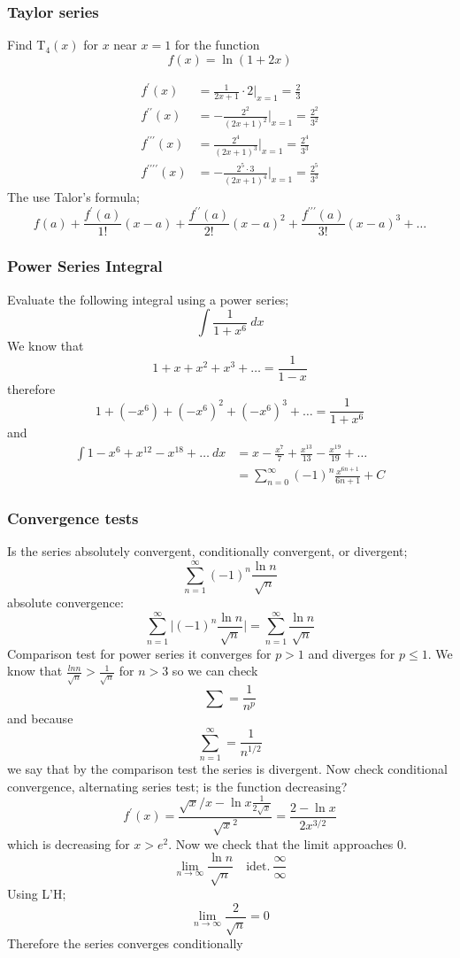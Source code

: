 \documentclass{article}
\begin{document}
\begin{multicols}{2}
\subsubsection*{Taylor series}
Find T$_4(x)$ for $x$ near $x=1$ for the function
\[
	f(x) = \ln (1+2x)
\]

\begin{align*}
	f^\prime(x) &= \frac{1}{2x+1} \cdot 2 \biggr\vert_{x=1} = \frac{2}{3} \\
	f^{\prime \prime}(x) &= -\frac{2^2}{(2x+1)^2} \biggr\vert_{x=1} = \frac{2^2}{3^2} \\
	f^{\prime \prime \prime}(x) &= \frac{2^4}{(2x+1)^3} \biggr\vert_{x=1} = \frac{2^4}{3^3}\\
	f^{\prime \prime \prime \prime}(x) &= -\frac{2^5 \cdot 3}{(2x+1)^4} \biggr\vert_{x=1} = \frac{2^5}{3^3}
\end{align*}
The use Talor's formula;
\[
	f(a) + \frac{f^\prime(a)}{1!}(x-a) + \frac{f^{\prime \prime}(a)}{2!}(x-a)^2 + \frac{f^{\prime \prime \prime}(a)}{3!}(x-a)^3 + \dots
\]

\subsubsection*{Power Series Integral}
Evaluate the following integral using a power series;
\[
	\int \frac{1}{1+x^6}\ dx
\]
We know that
\[
	1 + x + x^2 + x^3 + \dots = \frac{1}{1-x}
\]
therefore
\[
	1 + (-x^6) + (-x^6)^2 + (-x^6)^3 + \dots = \frac{1}{1+x^6}
\]
and
\begin{align*}
	\int 1-x^6+x^{12}-x^{18} + \dots \ dx &= x - \frac{x^7}{7}+\frac{x^13}{13}-\frac{x^19}{19} + \dots \\
	&= \sum_{n=0}^\infty (-1)^n \frac{ x^{6n+1}}{6n+1} + C
\end{align*}

\subsubsection*{Convergence tests}
Is the series absolutely convergent, conditionally convergent, or divergent;
\[
	\sum_{n=1}^\infty (-1)^n \frac{\ln n}{\sqrt{n}}
\]
absolute convergence:
\[
	\sum_{n=1}^\infty \Biggr\vert (-1)^n \frac{\ln n}{\sqrt{n}} \Biggr\vert = \sum_{n=1}^\infty \frac{\ln n}{\sqrt{n}}
\]
Comparison test
for power series it converges for $p > 1$ and diverges for $p \le 1$. We know that $\frac{ln n}{\sqrt{n}} > \frac{1}{\sqrt{n}}$ for $n>3$ so we can check
\[
	\sum = \frac{1}{n^p}
\]
and because
\[
	\sum_{n=1}^\infty = \frac{1}{n^{1/2}}
\]
we say that by the comparison test the series is divergent. Now check conditional convergence, alternating series test; is the function decreasing?
\[
	f^\prime(x) = \frac{\sqrt{x}/x - \ln x \frac{1}{2\sqrt{x}}}{\sqrt{x}^2} = \frac{2-\ln x}{2x^{3/2}}
\]
which is decreasing for $x > e^2$. Now we check that the limit approaches 0.
\[
	\lim_{n \to \infty} \frac{\ln n}{\sqrt{n}} \quad \text{idet.}\ \frac{\infty}{\infty}
\]
Using L'H;
\[
	\lim_{n \to \infty} \frac{2}{\sqrt{n}} = 0
\]
Therefore the series converges conditionally


\end{multicols}
\end{document}
